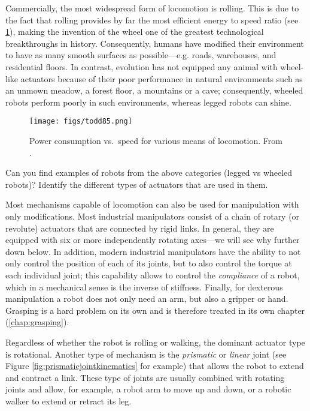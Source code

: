 Commercially, the most widespread form of locomotion is rolling. This is due to the fact that rolling provides by far the most efficient energy to speed ratio (see \cref{fig:todd}), making the invention of the wheel one of the greatest technological breakthroughs in history. Consequently, humans have modified their environment to have as many smooth surfaces as possible---e.g. roads, warehouses, and residential floors.
%
In contrast, evolution has not equipped any animal with wheel-like actuators because of their poor performance in natural environments such as an unmown meadow, a forest floor, a mountains or a cave; consequently, wheeled robots perform poorly in such environments, whereas legged robots can shine.

\begin{figure}
    \centering
    \texttt{[image: figs/todd85.png]}
    \caption{Power consumption vs.\ speed for various means of locomotion. From \protect{}.}
    \label{fig:todd}
\end{figure}


\begin{mdframed}Can you find examples of robots from the above categories (legged vs wheeled robots)? Identify the different types of actuators that are used in them.
\end{mdframed}

Most mechanisms capable of locomotion can also be used for manipulation with only modifications. Most industrial manipulators consist of a chain of rotary (or revolute) actuators that are connected by rigid links. In general, they are equipped with six or more independently rotating axes---we will see why further down below. In addition, modern industrial manipulators have the ability to not only control the position of each of its joints, but to also control the torque at each individual joint; this capability allows to control the \textsl{compliance} of a robot, which in a mechanical sense is the inverse of stiffness. Finally, for dexterous manipulation a robot does not only need an arm, but also a gripper or hand. Grasping is a hard problem on its own and is therefore treated in its own chapter (\cref{chap:grasping}).

Regardless of whether the robot is rolling or walking, the dominant actuator type is rotational. Another type of mechanism is the \emph{prismatic} or \emph{linear} joint (see Figure \ref{fig:prismaticjointkinematics} for example) that allows the robot to extend and contract a link. These type of joints are usually combined with rotating joints and allow, for example, a robot arm to move up and down, or a robotic walker to extend or retract its leg. 

